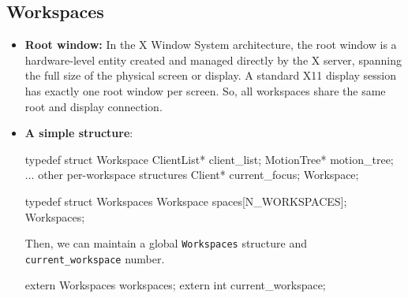 \documentclass{report}
\begin{document}
\begin{itemize}
    \end{itemize}


    \pagebreak 
    \subsection{Workspaces}
    \begin{itemize}
        \item \textbf{Root window:} In the X Window System architecture, the root window is a hardware-level entity created and managed directly by the X server, spanning the full size of the physical screen or display. A standard X11 display session has exactly one root window per screen. So, all workspaces share the same root and display connection.
        \item \textbf{A simple structure}: 
            \bigbreak \noindent 
            \begin{cppcode}
                typedef struct Workspace {
                    ClientList* client_list;
                    MotionTree* motion_tree;
                    ... other per-workspace structures
                    Client* current_focus;
                } Workspace;

                typedef struct Workspaces {
                    Workspace spaces[N_WORKSPACES];
                } Workspaces;
            \end{cppcode}
            \bigbreak \noindent 
            Then, we can maintain a global \texttt{Workspaces} structure and \texttt{current\_workspace} number.
            \bigbreak \noindent 
            \begin{cppcode}
                extern Workspaces workspaces;
                extern int current_workspace;
            \end{cppcode}
    \end{itemize}

    \pagebreak 
\end{document}
